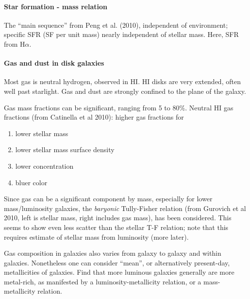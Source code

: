 \documentclass{article}
\begin{document}
\paragraph{Star formation - mass relation}
The ``main sequence'' from Peng et al. (2010), independent of environment;
specific SFR (SF per unit mass) nearly independent of stellar mass.
Here, SFR from H$\alpha$.

\paragraph{Gas and dust in disk galaxies}
Most gas is neutral hydrogen, observed in HI.
HI disks are very extended, often well past starlight.
Gas and dust are strongly confined to the plane of the galaxy.

Gas mass fractions can be significant, ranging from 5 to 80\%.
Neutral HI gas fractions (from Catinella et al
2010): higher gas fractions for
\begin{enumerate}
    \item lower stellar mass
    \item lower stellar mass surface density
    \item lower concentration
    \item bluer color
\end{enumerate}
Since gas can be a significant component by mass, especially for lower
mass/luminosity galaxies, the \emph{baryonic} Tully-Fisher relation (from
Gurovich et al 2010, left is stellar mass, right includes gas mass), has been
considered. This seems to show even less scatter than the stellar T-F relation;
note that this requires estimate of stellar mass from luminosity (more later).

Gas composition in galaxies also varies from galaxy to galaxy and within
galaxies. Nonetheless one can consider ``mean'', or alternatively present-day,
metallicities of galaxies. Find that more luminous galaxies generally are more
metal-rich, as manifested by a luminosity-metallicity relation, or a
mass-metallicity relation.
\end{document}
